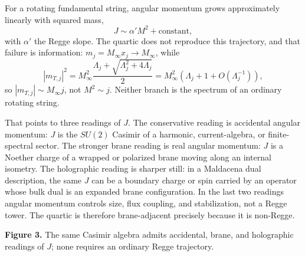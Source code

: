 \documentclass[11pt]{article}
\newcommand{\Lspin}{\Lambda_j}
\newcommand{\hb}{\hbar}
\begin{document}
For a rotating fundamental string, angular momentum grows approximately linearly with squared mass,
\[
        J\sim \alpha' M^2+\text{constant},
\]
with \(\alpha'\) the Regge slope. The quartic does not reproduce this trajectory, and that failure is information: \(m_j=M_\infty x_j\to M_\infty\), while
\[
        |m_{T,j}|^2
        =
        M_\infty^2\frac{\Lspin+\sqrt{\Lspin^2+4\Lspin}}{2}
        =
        M_\infty^2(\Lspin+1+O(\Lspin^{-1})),
\]
so \(|m_{T,j}|\sim M_\infty j\), not \(M^2\sim j\). Neither branch is the spectrum of an ordinary rotating string.

That points to three readings of \(J\). The conservative reading is accidental angular momentum: \(J\) is the \(SU(2)\) Casimir of a harmonic, current-algebra, or finite-spectral sector. The stronger brane reading is real angular momentum: \(J\) is a Noether charge of a wrapped or polarized brane moving along an internal isometry. The holographic reading is sharper still: in a Maldacena dual description, the same \(J\) can be a boundary charge or spin carried by an operator whose bulk dual is an expanded brane configuration. In the last two readings angular momentum controls size, flux coupling, and stabilization, not a Regge tower. The quartic is therefore brane-adjacent precisely because it is non-Regge.

\begin{center}

\textbf{Figure 3.} The same Casimir algebra admits accidental, brane, and holographic readings of \(J\); none requires an ordinary Regge trajectory.
\end{center}
\end{document}
